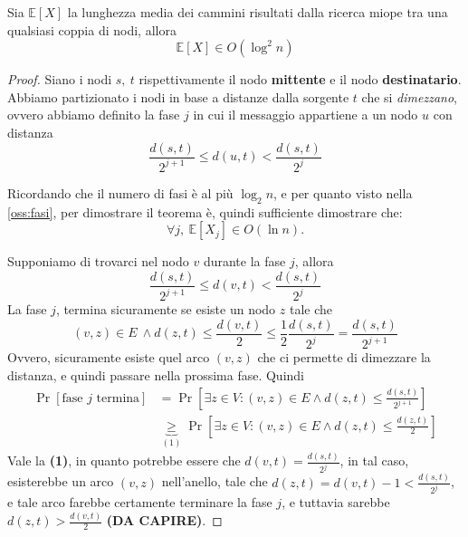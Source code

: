 \begin{teorema}
    Sia $\mathbb{E}\left[ X \right]$ la lunghezza media dei cammini risultati dalla ricerca miope tra una qualsiasi coppia di nodi, allora 
    \[
    \mathbb{E}\left[ X \right] \in O(\log^2{n})
    \]
\end{teorema}
\begin{proof}
    Siano i nodi $s,\ t$ rispettivamente il nodo \textbf{mittente} e il nodo \textbf{destinatario}. Abbiamo partizionato i nodi in base a distanze dalla sorgente $t$ che si \textit{dimezzano}, ovvero abbiamo definito la fase $j$ in cui il messaggio appartiene a un nodo $u$ con distanza
\[
\frac{d(s,t)}{2^{j+1}} \leq d(u,t) < \frac{d(s,t)}{2^j}
\]

Ricordando che il numero di fasi è al più $\log_2n$, e per quanto visto nella \autoref{oss:fasi}, per dimostrare il teorema è, quindi sufficiente dimostrare che:
\[
\forall j,\ \mathbb{E}[X_j] \in O(\ln n).
\]

Supponiamo di trovarci nel nodo $v$ durante la fase $j$, allora
\[
\frac{d(s,t)}{2^{j+1}} \leq d(v,t) < \frac{d(s,t)}{2^j}
\]
La fase $j$, termina sicuramente se esiste un nodo $z$ tale che
\[
(v, z) \in E\ \land d(z, t) \leq \frac{d(v, t)}{2} \leq \frac{1}{2} \frac{d(s, t)}{2^j} = \frac{d(s, t)}{2^{j + 1}} 
\]
Ovvero, sicuramente esiste quel arco $(v, z)$ che ci permette di dimezzare la distanza, e quindi passare nella prossima fase. Quindi
\begin{align*}
\Pr[\text{fase $j$ termina}] &= \Pr\left[\exists z \in V: (v, z) \in E \land d(z, t) \leq \frac{d(s, t)}{2^{j + 1}}\right] \\
&\underbrace{\geq}_{(1)} \Pr\left[\exists z \in V: (v, z) \in E \land d(z, t) \leq \frac{d(z, t)}{2} \right] 
\end{align*}
Vale la \textbf{(1)}, in quanto potrebbe essere che $d(v, t) = \frac{d(s, t)}{2^j}$, in tal caso, esisterebbe un arco $(v, z)$ nell'anello, tale che $d(z, t) = d(v, t) - 1 < \frac{d(s, t)}{2^j}$, e tale arco farebbe certamente terminare la fase $j$, e tuttavia sarebbe $d(z, t) > \frac{d(v, t)}{2}$ \textbf{(DA CAPIRE)}.


\end{proof}
